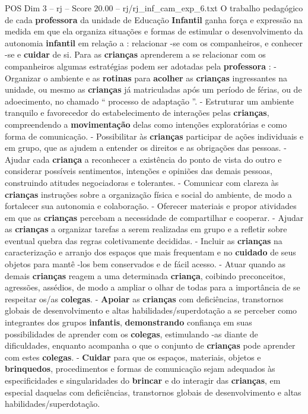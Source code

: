 \begin{textsample}{POS Dim 3 – rj – Score 20.00 – rj/rj\_inf\_cam\_exp\_6.txt}  \label{ex:f3_pos_011}
O trabalho pedagógico de cada \textbf{professora} da unidade de Educação \textbf{Infantil} ganha força e expressão na medida em que ela organiza situações e formas de estimular o desenvolvimento da autonomia \textbf{infantil} em relação a : relacionar -se com os companheiros, e conhecer -se e \textbf{cuidar} de si.
Para as \textbf{crianças} aprenderem a se relacionar com os companheiros algumas estratégias podem ser adotadas pela \textbf{professora} : - Organizar o ambiente e as \textbf{rotinas} para \textbf{acolher} as \textbf{crianças} ingressantes na unidade, ou mesmo as \textbf{crianças} já matriculadas após um período de férias, ou de adoecimento, no chamado “ processo de adaptação ”. - Estruturar um ambiente tranquilo e favorecedor do estabelecimento de interações pelas \textbf{crianças}, compreendendo a \textbf{movimentação} delas como intenções exploratórias e como forma de comunicação. - Possibilitar às \textbf{crianças} participar de ações individuais e em grupo, que as ajudem a entender os direitos e as obrigações das pessoas. - Ajudar cada \textbf{criança} a reconhecer a existência do ponto de vista do outro e considerar possíveis sentimentos, intenções e opiniões das demais pessoas, construindo atitudes negociadoras e tolerantes. - Comunicar com clareza às \textbf{crianças} instruções sobre a organização física e social do ambiente, de modo a fortalecer sua autonomia e colaboração. - Oferecer materiais e propor atividades em que as \textbf{crianças} percebam a necessidade de compartilhar e cooperar. - Ajudar as \textbf{crianças} a organizar tarefas a serem realizadas em grupo e a refletir sobre eventual quebra das regras coletivamente decididas. - Incluir as \textbf{crianças} na caracterização e arranjo dos espaços que mais frequentam e no \textbf{cuidado} de seus objetos para mantê -los bem conservados e de fácil acesso. - Atuar quando as demais \textbf{crianças} reagem a uma determinada \textbf{criança}, coibindo preconceitos, agressões, assédios, de modo a ampliar o olhar de todas para a importância de se respeitar os/as \textbf{colegas}. - \textbf{Apoiar} as \textbf{crianças} com deficiências, transtornos globais de desenvolvimento e altas habilidades/superdotação a se perceber como integrantes dos grupos \textbf{infantis}, \textbf{demonstrando} confiança em suas possibilidades de aprender com os \textbf{colegas}, estimulando -as diante de dificuldades, enquanto acompanha o que o conjunto de \textbf{crianças} pode aprender com estes \textbf{colegas}. - \textbf{Cuidar} para que os espaços, materiais, objetos e \textbf{brinquedos}, procedimentos e formas de comunicação sejam adequados às especificidades e singularidades do \textbf{brincar} e do interagir das \textbf{crianças}, em especial daquelas com deficiências, transtornos globais de desenvolvimento e altas habilidades/superdotação.

\end{textsample}
